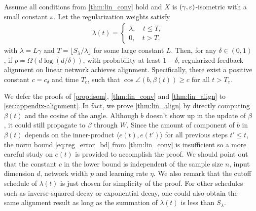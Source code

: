 \begin{theorem}
\label{thm:lin_align}
Assume all conditions from \cref{thm:lin_conv} hold and $X$ is $(\gamma, \varepsilon)$-isometric with a small constant $\varepsilon$. Let the regularization weights satisfy
\begin{align*}
\lambda(t) =
\begin{cases}
    \lambda, \quad t\leq T,\\
    0, \quad t > T,
\end{cases}
\end{align*}
with $\lambda=L\gamma$ and $T = \lfloor S_\lambda/\lambda\rfloor$ for some large constant $L$. Then, for any $\delta\in(0,1)$, if $p = \Omega(d\log(d/\delta))$, with probability at least $1-\delta$, regularized feedback alignment on linear network achieves alignment. Specifically, there exist a positive constant $c=c_\delta$ and time $T_c$, such that $\cos\angle(b, \beta(t))\geq c$ for all $t>T_c$.
\end{theorem}

We defer the proofs of \cref{prop:isom}, \cref{thm:lin_conv} and \cref{thm:lin_align} to \cref{sec:appendix-alignment}. In fact, we prove \cref{thm:lin_align} by directly computing $\beta(t)$ and the cosine of the angle. Although $b$ doesn't show up in the update of $\beta$, it could still propagate to $\beta$ through $W$. Since the amount of component of $b$ in $\beta(t)$ depends on the inner-product $\langle e(t), e(t')\rangle$ for all previous steps $t'\leq t$, the norm bound \eqref{eq:reg_error_bd} from \cref{thm:lin_conv} is insufficient so a more careful study on $e(t)$ is provided to accomplish the proof. We should point out that the constant $c$ in the lower bound is independent of the sample size $n$, input dimension $d$, network width $p$ and learning rate $\eta$. We also remark that the cutoff schedule of $\lambda(t)$ is just chosen for simplicity of the proof. For other schedules such as inverse-squared decay or exponential decay, one could also obtain the same alignment result as long as the summation of $\lambda(t)$ is less than $S_\lambda$.

